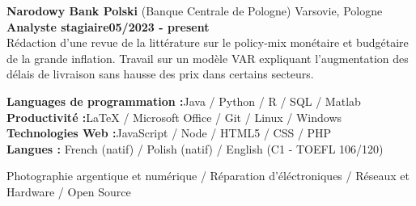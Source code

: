 \documentclass[11pt]{report}
\begin{document}
\noindent\textbf{Narodowy Bank Polski} (Banque Centrale de Pologne) \hfill Varsovie, Pologne \\[0.1cm]
\textbf{Analyste stagiaire}\hfill \textbf{05/2023 - present} \\
Rédaction d'une revue de la littérature sur le policy-mix monétaire et budgétaire de la grande inflation. Travail sur un modèle VAR expliquant l'augmentation des délais de livraison sans hausse des prix dans certains secteurs. 

	\begin{flushleft}
	 \hrulefill
	\end{flushleft}



  \noindent\textbf{Languages de programmation :}\hfill{Java / Python / R / SQL / Matlab} \\
  \textbf{Productivité :}\hfill LaTeX / Microsoft Office / Git / Linux / Windows\\
  \textbf{Technologies Web :}\hfill JavaScript / Node / HTML5 / CSS / PHP  \\
  \textbf{Langues :} \hfill French (natif) / Polish (natif) / English (C1 - TOEFL 106/120) 

	\begin{flushleft}
	 \hrulefill
	\end{flushleft}

\noindent Photographie argentique et numérique / Réparation d'éléctroniques / Réseaux et Hardware / Open Source
\end{document}

